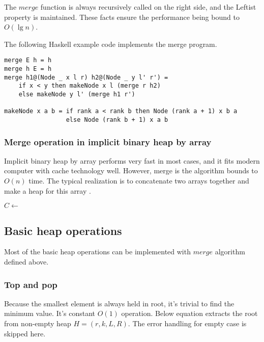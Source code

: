 \documentclass[UTF8]{article}
\begin{document}
The $merge$ function is always recursively called on the right side,
and the Leftist property is maintained. These facts ensure the performance
being bound to $O(\lg n)$.

The following Haskell example code implements the merge program.

\lstset{language=Haskell}
\begin{lstlisting}
merge E h = h
merge h E = h
merge h1@(Node _ x l r) h2@(Node _ y l' r') =
    if x < y then makeNode x l (merge r h2)
    else makeNode y l' (merge h1 r')

makeNode x a b = if rank a < rank b then Node (rank a + 1) x b a
                 else Node (rank b + 1) x a b
\end{lstlisting}

\subsubsection{Merge operation in implicit binary heap by array}

Implicit binary heap by array performs very fast in most cases, and
it fits modern computer with cache technology well. However, merge
is the algorithm bounds to $O(n)$ time. The typical realization is to
concatenate two arrays together and make a heap for this array \cite{NIST}.

\begin{algorithmic}[1]
  \State $C \gets$ 
  \State {}
\EndFunction
\end{algorithmic}

\subsection{Basic heap operations}

Most of the basic heap operations can be implemented with $merge$
algorithm defined above.

\subsubsection{Top and pop}
Because the smallest element is always held in root, it's trivial
to find the minimum value. It's constant $O(1)$ operation. Below
equation extracts the root from non-empty heap $H = (r, k, L, R)$.
The error handling for empty case is skipped here.
\end{document}
